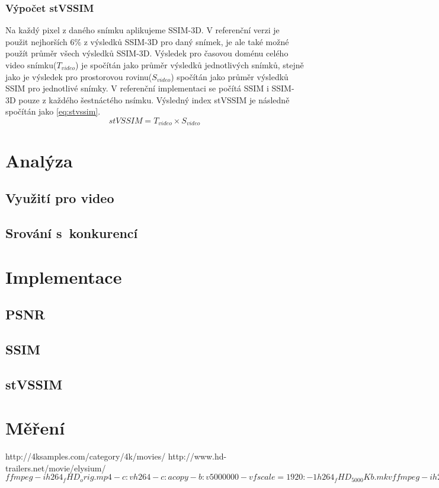 \documentclass[thesis=M,czech]{FITthesis}[2016/06/26]
\begin{document}
\subsection{Výpočet stVSSIM}
Na každý pixel z daného snímku aplikujeme SSIM-3D. V referenční verzi je použit nejhorších 6\% z výsledků SSIM-3D pro daný snímek, je ale také možné použít průměr všech výsledků SSIM-3D. Výsledek pro časovou doménu celého video snímku($T_{video}$) je spočítán jako průměr výsledků jednotlivých snímků, stejně jako je výsledek pro prostorovou rovinu($S_{video}$) spočítán jako průměr výsledků SSIM pro jednotlivé snímky. V referenční implementaci se počítá SSIM i SSIM-3D pouze z každého šestnáctého nsímku. Výsledný index stVSSIM je následně spočítán jako \ref{eq:stvssim}.
\begin{equation} \label{eq:stvssim}
\mathit{stVSSIM} = T_{video}\times S_{video}
\end{equation}

\chapter{Analýza}

\section{Využití pro video}
\section{Srování s~konkurencí}

\chapter{Implementace}
\section{PSNR}
\section{SSIM}
\section{stVSSIM}


\chapter{Měření}
http://4ksamples.com/category/4k/movies/
http://www.hd-trailers.net/movie/elysium/
$ffmpeg -i h264_fHD_orig.mp4 -c:v h264 -c:a copy -b:v 5000000 -vf scale=1920:-1 h264_fHD_5000Kb.mkv
ffmpeg -i h264_fHD_orig.mp4 -c:v vp9 -c:a copy -b:v 5000000 -vf scale=1920:-1 vp9_fHD_5000Kb.mkv
ffmpeg -i h264_fHD_orig.mp4 -c:v hevc -c:a copy -b:v 5000000 -vf scale=1920:-1 h265_fHD_5000Kb.mkv
ffmpeg -i h264_fHD_orig.mp4 -c:v mpeg2video -c:a copy -b:v 5000000 -vf scale=1920:-1 mpeg2_fHD_5000Kb.mkv
ffmpeg -i h264_fHD_orig.mp4 -c:v mpeg4 -c:a copy -b:v 5000000 -vf scale=1920:-1 mpeg4_fHD_5000Kb.mkv$
\end{document}

